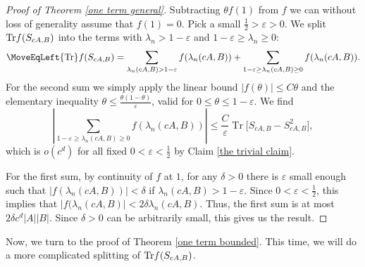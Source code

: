 \documentclass[12pt]{amsart}
\numberwithin{equation}{section}
\newcommand{\eps}{\varepsilon}
\begin{document}
\begin{proof}[Proof of Theorem \ref{one term general}]
Subtracting $\theta f(1)$ from $f$ we can without loss of generality assume that $f(1) = 0$. Pick a small $\frac{1}{2} > \eps > 0$. We split ${\rm Tr}f(S_{cA,B})$ into the terms with $\lambda_n > 1-\eps$ and $1-\eps \ge \lambda_n \ge 0$:
\begin{align*}
\MoveEqLeft{\rm Tr}f(S_{cA,B})= \sum_{\lambda_n(cA, B) > 1-\eps}f(\lambda_n(cA,B))  +\sum_{1-\eps\ge\lambda_n(cA, B) \geq 0 }f(\lambda_n(cA,B)).
\end{align*}
For the second sum we simply apply the linear bound $|f(\theta)| \leq C \theta$ and the elementary inequality $\theta \leq \frac{\theta(1-\theta)}{\eps}$, valid for $0\leq \theta \leq 1-\eps$. We find
\[
\left|\sum_{1-\eps\ge\lambda_n(cA, B) \geq 0 }f(\lambda_n(cA,B))\right| \leq \frac{C}{\eps} \operatorname{Tr}\big[ S_{cA,B} - S_{cA,B}^2\big],
\]
which is $o(c^d)$ for all fixed $0<\eps <\frac{1}{2}$ by Claim \ref{the trivial claim}.

For the first sum, by continuity of $f$ at $1$, for any $\delta > 0$ there is $\eps$ small enough such that $|f(\lambda_n(cA, B))| < \delta$ if $\lambda_n(cA, B) > 1-\eps$. Since $0 < \eps < \frac{1}{2}$, this implies that $|f(\lambda_n(cA,B)| < 2\delta \lambda_n(cA,B)$. Thus, the first sum is at most $2\delta c^d |A| |B|$. Since $\delta >0$ can be arbitrarily small, this gives us the result.
\end{proof}

Now, we turn to the proof of Theorem \ref{one term bounded}. This time, we will do a more complicated splitting of ${\rm Tr}f(S_{cA,B})$. 
\end{document}
